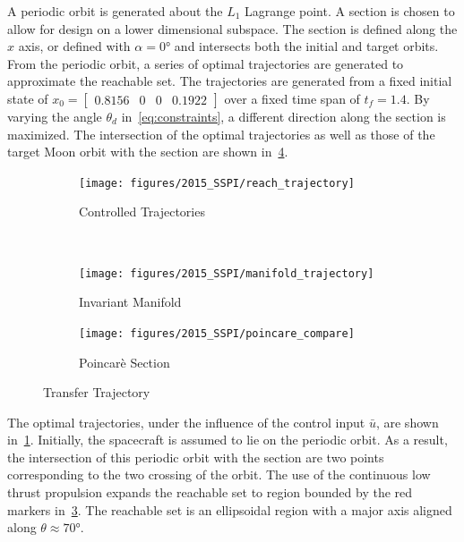 A periodic orbit is generated about the \( L_1 \) Lagrange point. 
A \Poincare section is chosen to allow for design on a lower dimensional subspace.
The section is defined along the \( \hat{x} \) axis, or defined with \( \alpha = \ang{0} \) and intersects both the initial and target orbits.
From the periodic orbit, a series of optimal trajectories are generated to approximate the reachable set.
The trajectories are generated from a fixed initial state of \( x_0 = \begin{bmatrix}0.8156 & 0 & 0 & 0.1922 \end{bmatrix} \) over a fixed time span of \( t_f = 1.4 \).
By varying the angle \( \theta_d\) in~\cref{eq:constraints}, a different direction along the \Poincare section is maximized. 
The intersection of the optimal trajectories as well as those of the target Moon orbit with the \Poincare section are shown in~\cref{fig:transfer_orbit}.
\begin{figure} 
	\centering 
	\begin{subfigure}[htbp]{0.5\textwidth} 
		\texttt{[image: figures/2015\_SSPI/reach\_trajectory]} 
		\caption{Controlled Trajectories} \label{fig:reach_trajectory} 
	\end{subfigure}~ %
	\begin{subfigure}[htbp]{0.5\textwidth} 
		\texttt{[image: figures/2015\_SSPI/manifold\_trajectory]} 
		\caption{Invariant Manifold} \label{fig:manifold_trajectory} 
	\end{subfigure} 
	
	\begin{subfigure}[htbp]{0.5\textwidth} 
		\texttt{[image: figures/2015\_SSPI/poincare\_compare]} 
		\caption{Poincar\`e Section} \label{fig:poincare_compare} 
	\end{subfigure} 
	\caption{Transfer Trajectory}
	\label{fig:transfer_orbit} 
\end{figure}
The optimal trajectories, under the influence of the control input \( \bar{u} \), are shown in~\cref{fig:reach_trajectory}.
Initially, the spacecraft is assumed to lie on the periodic orbit.
As a result, the intersection of this periodic orbit with the \Poincare section are two points corresponding to the two crossing of the orbit.
The use of the continuous low thrust propulsion expands the reachable set to region bounded by the red markers in~\cref{fig:poincare_compare}.
The reachable set is an ellipsoidal region with a major axis aligned along \( \theta \approx \ang{70} \).

